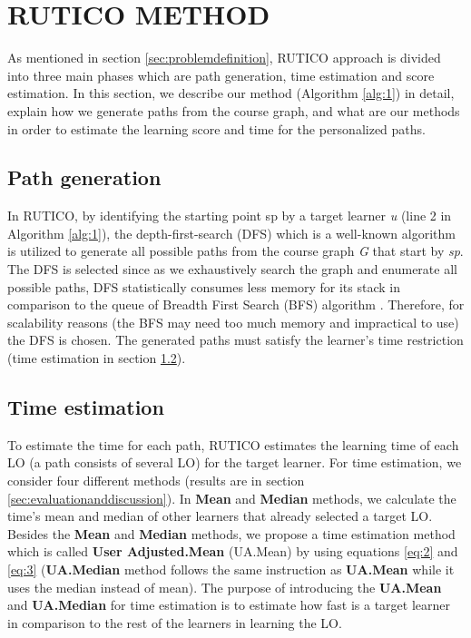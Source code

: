 \documentclass{sig-alternate}
\begin{document}
\section{RUTICO METHOD}
\label{sec:ruticomethod}
\noindent As mentioned in section \ref{sec:problemdefinition}, RUTICO approach is divided into three main phases which are path generation, time estimation and score estimation. In this section, we describe our method (Algorithm \ref{alg:1}) in detail, explain how we generate paths from the course graph, and what are our methods in order to estimate the learning score and time for the personalized paths.

\subsection{Path generation}
\label{subsec:pathgeneration}
\noindent In RUTICO, by identifying the starting point sp by a target learner \textit{u} (line 2 in Algorithm \ref{alg:1}), the depth-first-search (DFS) which is a well-known algorithm is utilized to generate all possible paths from the course graph \textit{G} that start by \textit{sp}. The DFS is selected since as we exhaustively search the graph and enumerate all possible paths, DFS statistically consumes less memory for its stack in comparison to the queue of Breadth First Search (BFS) algorithm \cite{bundy1984breadth}. Therefore, for scalability reasons (the BFS may need too much memory and impractical to use) the DFS is chosen. The generated paths must satisfy the learner’s time restriction (time estimation in section \ref{subsec:timeestimation}).

\subsection{Time estimation}
\label{subsec:timeestimation}
\noindent To estimate the time for each path, RUTICO estimates the learning time of each LO (a path consists of several LO) for the target learner. For time estimation, we consider four different methods (results are in section \ref{sec:evaluationanddiscussion}). In \textbf{Mean} and \textbf{Median} methods, we calculate the time’s mean and median of other learners that already selected a target LO. Besides the \textbf{Mean} and \textbf{Median} methods, we propose a time estimation method which is called \textbf{User Adjusted.Mean}
(UA.Mean) by using equations \ref{eq:2} and \ref{eq:3} (\textbf{UA.Median} method follows the same instruction as \textbf{UA.Mean} while it uses the median instead of mean). The purpose of introducing the \textbf{UA.Mean} and \textbf{UA.Median} for time estimation is to estimate how fast is a target learner in comparison to the rest of the learners in learning the LO.
\end{document}
